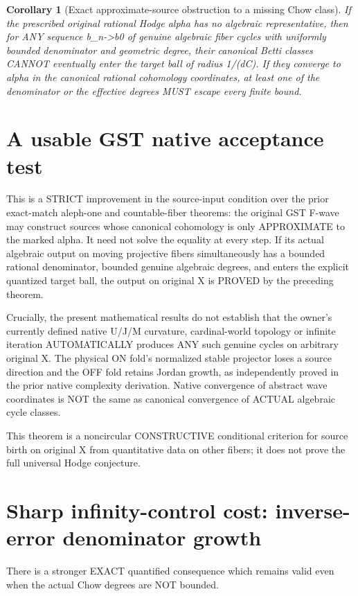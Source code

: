 \documentclass{article}
\newtheorem{corollary}{Corollary}
\begin{document}
\begin{corollary}[Exact approximate-source obstruction to a missing Chow class]
If the prescribed original rational Hodge alpha
has no algebraic representative, then for ANY
sequence b_n->b0 of genuine algebraic fiber
cycles with uniformly bounded denominator and
geometric degree, their canonical Betti classes
CANNOT eventually enter the target ball
of radius 1/(dC).
If they converge to alpha in the canonical
rational cohomology coordinates, at least one
of the denominator or the effective degrees
MUST escape every finite bound.
\end{corollary}

\section{A usable GST native acceptance test}
This is a STRICT improvement in the source-input condition
over the prior exact-match aleph-one and countable-fiber theorems:
the original GST F-wave may construct sources whose
canonical cohomology is only APPROXIMATE to the marked
alpha. It need not solve the equality at every step.
If its actual algebraic output on moving projective
fibers simultaneously has a bounded rational denominator,
bounded genuine algebraic degrees, and enters the explicit
quantized target ball, the output on original X is
PROVED by the preceding theorem.

Crucially, the present mathematical results do not
establish that the owner's currently defined native U/J/M
curvature, cardinal-world topology or infinite iteration
AUTOMATICALLY produces ANY such genuine cycles on
arbitrary original X.
The physical ON fold's normalized stable projector
loses a source direction and the OFF fold retains
Jordan growth, as independently proved in the prior
native complexity derivation. Native convergence
of abstract wave coordinates is NOT the same as
canonical convergence of ACTUAL algebraic cycle classes.

This theorem is a noncircular CONSTRUCTIVE conditional
criterion for source birth on original X from quantitative
data on other fibers; it does not prove the full universal
Hodge conjecture.

\section{Sharp infinity-control cost: inverse-error denominator growth}
There is a stronger EXACT quantified consequence
which remains valid even when the actual Chow
degrees are NOT bounded.
\end{document}
